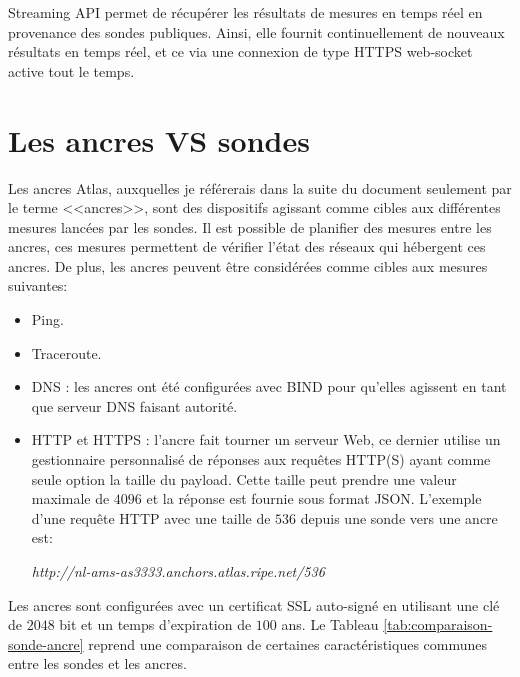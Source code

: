 Streaming API permet de récupérer les résultats de mesures en temps réel en provenance des sondes publiques. Ainsi, elle  fournit continuellement de nouveaux résultats en temps réel, et ce  via une connexion de type HTTPS web-socket active tout le temps.

\section{Les ancres VS sondes} \label{subsec:ancre}
Les ancres Atlas, auxquelles je référerais dans la suite du document seulement par le terme <<ancres>>, sont des dispositifs agissant comme cibles aux différentes mesures lancées par les sondes. Il est possible de planifier des mesures entre les ancres, ces mesures permettent de vérifier l'état des réseaux qui hébergent ces ancres. De plus, les ancres  peuvent être considérées comme  cibles aux mesures suivantes:
\begin{itemize}
	\item Ping.
	\item Traceroute.
	\item DNS : les ancres ont été configurées avec BIND pour qu'elles agissent en tant que serveur DNS faisant autorité.
	\item HTTP et HTTPS : l'ancre fait tourner un serveur Web, ce dernier utilise un gestionnaire  personnalisé de réponses aux requêtes HTTP(S) ayant comme seule option la taille du payload. 	 Cette taille peut prendre une valeur maximale de $4096$ et la réponse est fournie sous format JSON. L'exemple d'une requête HTTP avec une taille de $536$ depuis une sonde  vers une ancre  est: 
	\begin{tcolorbox}
		\textit{http://nl-ams-as3333.anchors.atlas.ripe.net/536}
	\end{tcolorbox}
\end{itemize}
Les ancres sont configurées avec un certificat SSL auto-signé en utilisant une clé de $2048$ bit et un temps d'expiration de $100$ ans. Le Tableau \ref{tab:comparaison-sonde-ancre} reprend une comparaison de certaines caractéristiques communes entre les sondes et les ancres.

